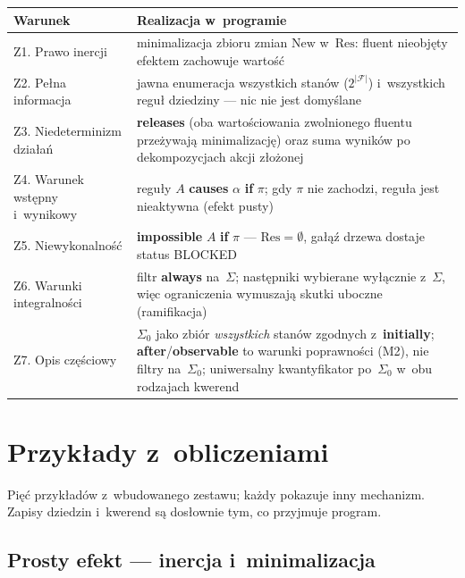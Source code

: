 \documentclass[11pt,a4paper]{article}
\newcommand{\Res}{\mathrm{Res}}
\newcommand{\New}{\mathrm{New}}
\begin{document}
\begin{center}
\small
\begin{tabular}{@{}p{4.6cm}p{9.8cm}@{}}
\toprule
\textbf{Warunek} & \textbf{Realizacja w~programie} \\
\midrule
Z1. Prawo inercji &
  minimalizacja zbioru zmian $\New$ w~$\Res$: fluent nieobjęty efektem
  zachowuje wartość \\
Z2. Pełna informacja &
  jawna enumeracja wszystkich stanów ($2^{|\mathcal{F}|}$) i~wszystkich
  reguł dziedziny --- nic nie jest domyślane \\
Z3. Niedeterminizm działań &
  \textbf{releases} (oba wartościowania zwolnionego fluentu przeżywają
  minimalizację) oraz suma wyników po dekompozycjach akcji złożonej \\
Z4. Warunek wstępny i~wynikowy &
  reguły $A$ \textbf{causes} $\alpha$ \textbf{if} $\pi$; gdy $\pi$ nie
  zachodzi, reguła jest nieaktywna (efekt pusty) \\
Z5. Niewykonalność &
  \textbf{impossible} $A$ \textbf{if} $\pi$ --- $\Res = \emptyset$,
  gałąź drzewa dostaje status BLOCKED \\
Z6. Warunki integralności &
  filtr \textbf{always} na~$\Sigma$; następniki wybierane wyłącznie
  z~$\Sigma$, więc ograniczenia wymuszają skutki uboczne (ramifikacja) \\
Z7. Opis częściowy &
  $\Sigma_0$ jako zbiór \emph{wszystkich} stanów zgodnych
  z~\textbf{initially}; \textbf{after}/\textbf{observable} to warunki
  poprawności (M2), nie filtry na~$\Sigma_0$; uniwersalny kwantyfikator
  po~$\Sigma_0$ w~obu rodzajach kwerend \\
\bottomrule
\end{tabular}
\end{center}

\section{Przykłady z~obliczeniami}

Pięć przykładów z~wbudowanego zestawu; każdy pokazuje inny mechanizm.
Zapisy dziedzin i~kwerend są dosłownie tym, co przyjmuje program.

\subsection{Prosty efekt --- inercja i~minimalizacja}
\end{document}
